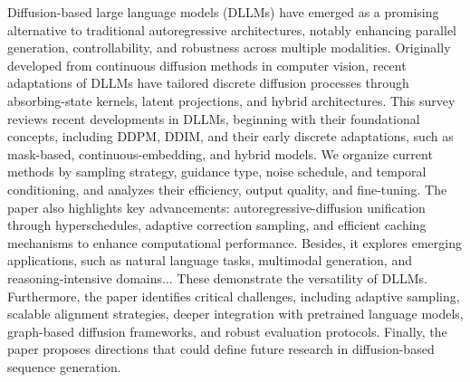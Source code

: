 Diffusion-based large language models (DLLMs) have emerged as a promising alternative to traditional autoregressive architectures, notably enhancing parallel generation, controllability, and robustness across multiple modalities. Originally developed from continuous diffusion methods in computer vision, recent adaptations of DLLMs have tailored discrete diffusion processes through absorbing-state kernels, latent projections, and hybrid architectures. This survey reviews recent developments in DLLMs, beginning with their foundational concepts, including DDPM, DDIM, and their early discrete adaptations, such as mask-based, continuous-embedding, and hybrid models. We organize current methods by sampling strategy, guidance type, noise schedule, and temporal conditioning, and analyzes their efficiency, output quality, and fine-tuning. The paper also highlights key advancements: autoregressive-diffusion unification through hyperschedules, adaptive correction sampling, and efficient caching mechanisms to enhance computational performance. Besides, it explores emerging applications, such as natural language tasks, multimodal generation, and reasoning-intensive domains... These demonstrate the versatility of DLLMs. Furthermore, the paper identifies critical challenges, including adaptive sampling, scalable alignment strategies, deeper integration with pretrained language models, graph-based diffusion frameworks, and robust evaluation protocols. Finally, the paper proposes directions that could define future research in diffusion-based sequence generation.